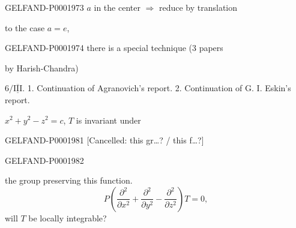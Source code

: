 \begin{GelfandAdjacentEvidence}{GELFAND-P000197}{3}
$a$ in the center $\Longrightarrow$ reduce by translation



\end{GelfandAdjacentEvidence}

to the case $a=e$,



\begin{GelfandAdjacentEvidence}{GELFAND-P000197}{4}
there is a special technique (3 papers



\end{GelfandAdjacentEvidence}

by Harish-Chandra)





\par\noindent\begin{minipage}{\linewidth}
$6/\overline{\underline{\mathrm{III}}}$. 
1. Continuation of Agranovich's report.
2. Continuation of G. I. Eskin's report.



\begin{center}\end{center}



$x^2+y^2-z^2=c$, $T$ is invariant under



\begin{GelfandAdjacentEvidence}{GELFAND-P000198}{1}
[Cancelled: this gr…? / this f…?]
\end{GelfandAdjacentEvidence}
\end{minipage}\par

\begin{GelfandAdjacentEvidence}{GELFAND-P000198}{2}

the group preserving this function.
\begin{equation*}
P\left (\frac{\partial^2}{\partial x^2}+\frac{\partial^2}{\partial y^2}-\frac{\partial^2}{\partial z^2}\right)T=0,
\end{equation*}
will $T$ be locally integrable?



\end{GelfandAdjacentEvidence}

